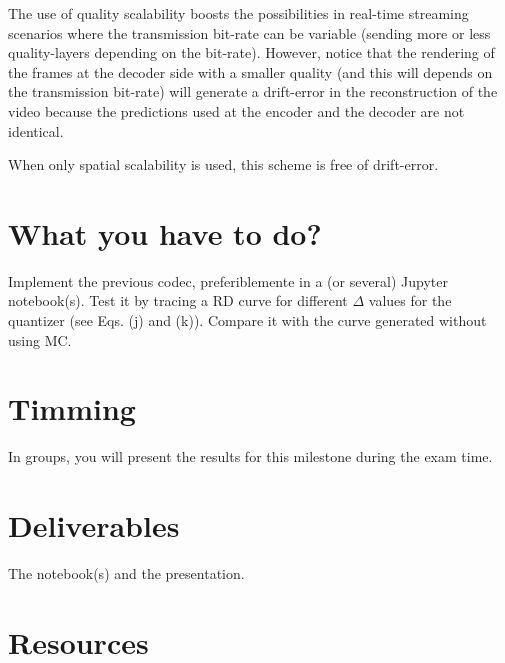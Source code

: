 The use of quality scalability boosts the possibilities in real-time
streaming scenarios where the transmission bit-rate can be variable
(sending more or less quality-layers depending on the
bit-rate). However, notice that the rendering of the
frames at the decoder side with a smaller quality (and this will
depends on the transmission bit-rate) will generate a drift-error in
the reconstruction of the video because the predictions used at the
encoder and the decoder are not identical.

When only spatial scalability is used, this scheme is free of
drift-error.

\section{What you have to do?}

Implement the previous codec, preferiblemente in a (or several)
Jupyter notebook(s). Test it by tracing a RD curve for different
$\Delta$ values for the quantizer (see Eqs. (j) and (k)). Compare it
with the curve generated without using MC.

\section{Timming}

In groups, you will present the results for this milestone during the
exam time.

\section{Deliverables}

The notebook(s) and the presentation.

\section{Resources}


